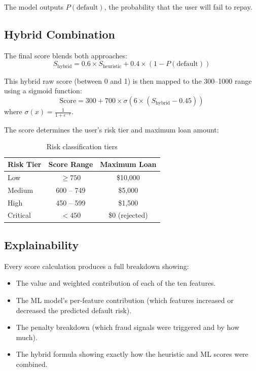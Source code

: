 \documentclass[12pt, a4paper]{article}
\begin{document}
The model outputs $P(\text{default})$, the probability that the user will fail to repay.

\subsection{Hybrid Combination}

The final score blends both approaches:
\[
S_{\text{hybrid}} = 0.6 \times S_{\text{heuristic}} + 0.4 \times (1 - P(\text{default}))
\]

This hybrid raw score (between 0 and 1) is then mapped to the 300--1000 range using a sigmoid function:
\[
\text{Score} = 300 + 700 \times \sigma\!\left(6 \times (S_{\text{hybrid}} - 0.45)\right)
\]
where $\sigma(x) = \frac{1}{1 + e^{-x}}$.

The score determines the user's risk tier and maximum loan amount:

\begin{table}[H]
\centering
\caption{Risk classification tiers}
\begin{tabular}{l c c}
\toprule
\textbf{Risk Tier} & \textbf{Score Range} & \textbf{Maximum Loan} \\
\midrule
Low & $\geq 750$ & \$10,000 \\
Medium & 600 -- 749 & \$5,000 \\
High & 450 -- 599 & \$1,500 \\
Critical & $< 450$ & \$0 (rejected) \\
\bottomrule
\end{tabular}
\end{table}

\subsection{Explainability}

Every score calculation produces a full breakdown showing:
\begin{itemize}[nosep]
    \item The value and weighted contribution of each of the ten features.
    \item The ML model's per-feature contribution (which features increased or decreased the predicted default risk).
    \item The penalty breakdown (which fraud signals were triggered and by how much).
    \item The hybrid formula showing exactly how the heuristic and ML scores were combined.
\end{itemize}
\end{document}
